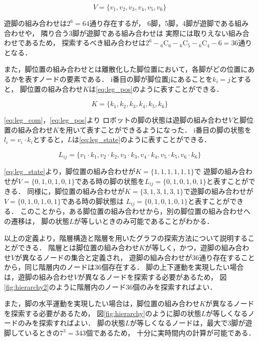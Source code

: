 \begin{equation}\label{eq:leg_com}
  V = \{v_1, v_2, v_3, v_4, v_5, v_6\}
\end{equation}

\noindent 遊脚の組み合わせは$2^6 = 64$通り存在するが，
6脚，5脚，4脚が遊脚である組み合わせや，
隣り合う3脚が遊脚である組み合わせは
実際には取りえない組み合わせであるため，
探索するべき組み合わせは$2^6 - {}_6 \mathrm{C}_6 - {}_6 \mathrm{C}_5 - {}_6 \mathrm{C}_4 - 6 = 36$通りとなる．

また，脚位置の組み合わせとは離散化した脚位置において，各脚がどの位置にあるかを表すノードの要素である．
i番目の脚が脚位置jにあることを$k_i = j$とすると，
脚位置の組み合わせ$K$は\eqref{eq:leg_pos}のように表すことができる．

\begin{equation}\label{eq:leg_pos}
  K = \{k_1, k_2, k_3, k_4, k_5, k_6\}
\end{equation}

\noindent\eqref{eq:leg_com}，\eqref{eq:leg_pos}より
ロボットの脚の状態は遊脚の組み合わせ$V$と脚位置の組み合わせ$K$を用いて表すことができるようになった．
i番目の脚の状態を$l_i = v_i \cdot k_i$とすると，$L$は\eqref{eq:leg_state}のように表すことができる．

\begin{equation}\label{eq:leg_state}
  L_{ij} = \{v_1 \cdot k_1, v_2 \cdot k_2, v_3 \cdot k_3, v_4 \cdot k_4, v_5 \cdot k_5, v_6 \cdot k_6\}
\end{equation}

\noindent\eqref{eq:leg_state}より，脚位置の組み合わせが$K = \{1,1,1,1,1,1\}$で
遊脚の組み合わせが$V = \{0,1,0,1,0,1\}$である時の脚の状態を$L_{ij} = \{0,1,0,1,0,1\}$と表すことができる．
同様に，脚位置の組み合わせが$K = \{3,1,3,1,3,1\}$で遊脚の組み合わせが$V = \{0,1,0,1,0,1\}$である時の脚状態は
$L_{ij} = \{0,1,0,1,0,1\}$と表すことができる．
このことから，ある脚位置の組み合わせから，別の脚位置の組み合わせへの遷移は，
脚の状態$L$が等しいときのみ可能であることがわかる．

以上の定義より，階層構造と階層を用いたグラフの探索方法について説明することができる．
階層とは脚位置の組み合わせ$K$が等しく，かつ，遊脚の組み合わせ$V$が異なるノードの集合と定義され，
遊脚の組み合わせが36通り存在することから，同じ階層内のノードは36個存在する．
脚の上下運動を実現したい場合は，遊脚の組み合わせ$V$が異なるノードを探索する必要があるため，
図\ref{fig:hierarchy2}のように階層内のノード36個のみを探索すればよい．

また，脚の水平運動を実現したい場合は，脚位置の組み合わせ$K$が異なるノードを探索する必要があるため，
図\ref{fig:hierarchy}のように脚の状態$L$が等しくなるノードのみを探索すればよい．
脚の状態$L$が等しくなるノードは，最大で3脚が遊脚しているときの$7^3 = 343$個であるため，
十分に実時間内の計算が可能である．

